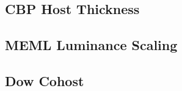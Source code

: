 \documentclass[../thesis.tex]{subfiles}
\begin{document}
\subsection{CBP Host Thickness}

\subsection{MEML Luminance Scaling}


\subsection{Dow Cohost}
\end{document}
